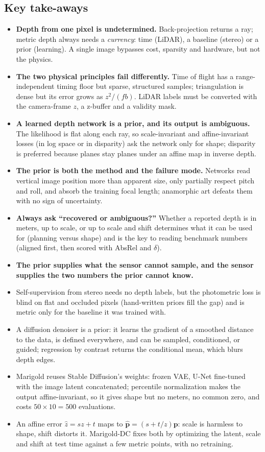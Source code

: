 \documentclass[11pt,a4paper]{article}
\theoremstyle{definition}
\theoremstyle{plain}
\theoremstyle{remark}
\begin{document}
\subsection*{Key take-aways}
\begin{itemize}
\item \textbf{Depth from one pixel is undetermined.} Back-projection returns a ray; metric depth always needs a \emph{currency}: time (LiDAR), a baseline (stereo) or a prior (learning). A single image bypasses cost, sparsity and hardware, but not the physics.
  \item \textbf{The two physical principles fail differently.} Time of flight has a range-independent timing floor but sparse, structured samples; triangulation is dense but its error grows as $z^2/(fb)$. LiDAR labels must be converted with the camera-frame $z$, a z-buffer and a validity mask.
  \item \textbf{A learned depth network is a prior, and its output is ambiguous.} The likelihood is flat along each ray, so scale-invariant and affine-invariant losses (in log space or in disparity) ask the network only for shape; disparity is preferred because planes stay planes under an affine map in inverse depth.
  \item \textbf{The prior is both the method and the failure mode.} Networks read vertical image position more than apparent size, only partially respect pitch and roll, and absorb the training focal length; anamorphic art defeats them with no sign of uncertainty.
  \item \textbf{Always ask ``recovered or ambiguous?''} Whether a reported depth is in meters, up to scale, or up to scale and shift determines what it can be used for (planning versus shape) and is the key to reading benchmark numbers (aligned first, then scored with AbsRel and $\delta$).
\item \textbf{The prior supplies what the sensor cannot sample, and the sensor supplies the two numbers the prior cannot know.}
 \item Self-supervision from stereo needs no depth labels, but the photometric loss is blind on flat and occluded pixels (hand-written priors fill the gap) and is metric only for the baseline it was trained with.
 \item A diffusion denoiser is a prior: it learns the gradient of a smoothed distance to the data, is defined everywhere, and can be sampled, conditioned, or guided; regression by contrast returns the conditional mean, which blurs depth edges.
 \item Marigold reuses Stable Diffusion's weights: frozen VAE, U-Net fine-tuned with the image latent concatenated; percentile normalization makes the output affine-invariant, so it gives shape but no meters, no common zero, and costs $50\times10=500$ evaluations.
 \item An affine error $\hat z=sz+t$ maps to $\hat{\bm p}=(s+t/z)\bm p$: scale is harmless to shape, shift distorts it. Marigold-DC fixes both by optimizing the latent, scale and shift at test time against a few metric points, with no retraining.
\end{itemize}
\end{document}
